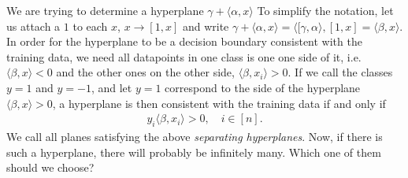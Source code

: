 \documentclass{article}
\newcommand{\sprod}[1]{\langle #1 \rangle}
\begin{document}
We are trying to determine a hyperplane $\gamma + \sprod{\alpha,x}$  To simplify the notation, let us attach a $1$ to each $x$, $x\to [1,x]$ and write $\gamma + \sprod{\alpha,x} = \sprod{[\gamma,\alpha},[1,x]=\sprod{\beta,x}$. In order for the hyperplane to be a  decision boundary consistent with the training data, we need all datapoints in one class is one one side of it, i.e. $\sprod{\beta,x}<0$ and the other ones on the other side, $\sprod{\beta,x_i}>0$. If we call the classes $y=1$ and $y=-1$, and let $y=1$ correspond to the side of the hyperplane $\sprod{\beta,x}>0$, a hyperplane is then consistent with the training data if and only if
\begin{align*}
    y_i \sprod{\beta,x_i}>0, \quad i \in [n].
\end{align*}
We call all planes satisfying the above \emph{separating hyperplanes}. Now, if there is such a hyperplane, there will probably be infinitely many. Which one of them should we choose?
\end{document}
